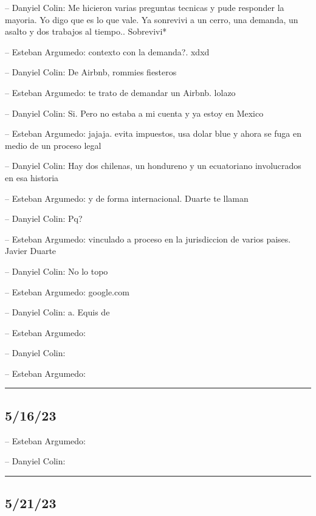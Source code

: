 -- Danyiel Colin: Me hicieron varias preguntas tecnicas y pude responder
la mayoria. Yo digo que es lo que vale. Ya sonrevivi a un cerro, una
demanda, un asalto y dos trabajos al tiempo.. Sobrevivi*

-- Esteban Argumedo: contexto con la demanda?. xdxd

-- Danyiel Colin: De Airbnb, rommies fiesteros

-- Esteban Argumedo: te trato de demandar un Airbnb. lolazo

-- Danyiel Colin: Si. Pero no estaba a mi cuenta y ya estoy en Mexico

-- Esteban Argumedo: jajaja. evita impuestos, usa dolar blue y ahora se
fuga en medio de un proceso legal

-- Danyiel Colin: Hay dos chilenas, un hondureno y un ecuatoriano
involucrados en esa historia

-- Esteban Argumedo: y de forma internacional. Duarte te llaman

-- Danyiel Colin: Pq?

-- Esteban Argumedo: vinculado a proceso en la jurisdiccion de varios
paises. Javier Duarte

-- Danyiel Colin: No lo topo

-- Esteban Argumedo: google.com

-- Danyiel Colin: a. Equis de

-- Esteban Argumedo:

-- Danyiel Colin:

-- Esteban Argumedo:

\begin{center}\rule{0.5\linewidth}{0.5pt}\end{center}

\hypertarget{section-203}{%
\subsection{5/16/23}\label{section-203}}

-- Esteban Argumedo:

-- Danyiel Colin:

\begin{center}\rule{0.5\linewidth}{0.5pt}\end{center}

\hypertarget{section-204}{%
\subsection{5/21/23}\label{section-204}}

